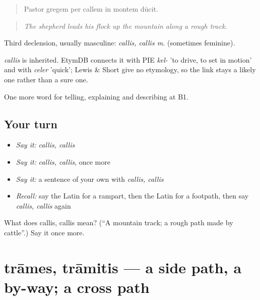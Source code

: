 \begin{quote}
Pastor gregem per callem in montem dūcit.
\end{quote}

\begin{quote}
\emph{The shepherd leads his flock up the mountain along a rough track.}
\end{quote}

Third declension, usually masculine: \emph{callis, callis m.} (sometimes feminine).

\begin{cousinweb}
\emph{callis} is inherited. EtymDB connects it with PIE \emph{kel-} 'to drive, to set in motion' and with \emph{celer} 'quick'; Lewis \& Short give no etymology, so the link stays a likely one rather than a sure one.
\end{cousinweb}

\begin{grammarlens}[title={What you've built}]
One more word for telling, explaining and describing at B1.
\end{grammarlens}

\subsection*{Your turn}
\begin{itemize}
\raggedright
  \item \emph{Say it:} \emph{callis, callis}
  \item \emph{Say it:} \emph{callis, callis}, once more
  \item \emph{Say it:} a sentence of your own with \emph{callis, callis}
  \item \emph{Recall:} say the Latin for a rampart, then the Latin for a footpath, then say \emph{callis, callis} again
\end{itemize}

\begin{tcolorbox}[breakable,colback=teal!4,colframe=teal!35!black,title={Before you move on}]
What does callis, callis mean? (\textquotedblleft{}A mountain track; a rough path made by cattle\textquotedblright{}.) Say it once more.
\end{tcolorbox}
\section[trāmes, trāmitis]{trāmes, trāmitis — a side path, a by-way; a cross path}

\label{lesson:LA-C423-trames}



